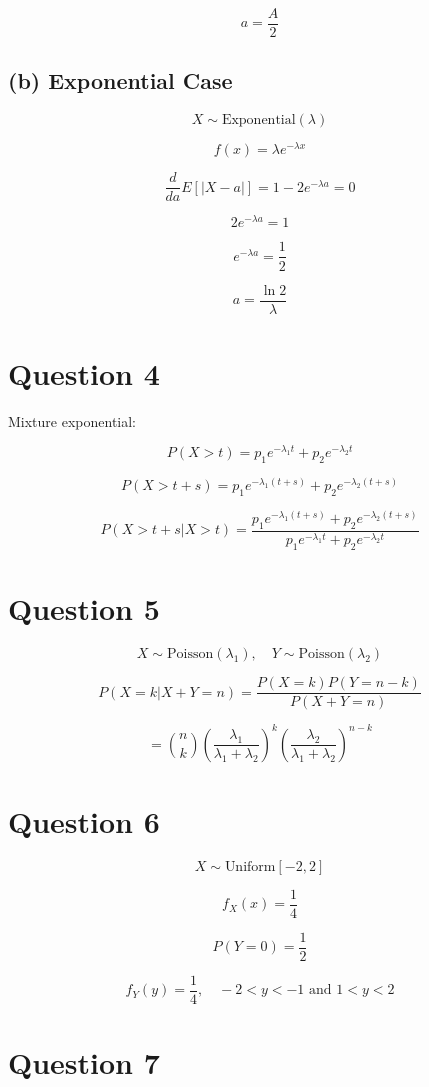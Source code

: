 \documentclass[12pt]{article}
\begin{document}
\[
a=\frac{A}{2}
\]

\subsection*{(b) Exponential Case}

\[
X \sim \text{Exponential}(\lambda)
\]

\[
f(x)=\lambda e^{-\lambda x}
\]

\[
\frac{d}{da}E[|X-a|]=1-2e^{-\lambda a}=0
\]

\[
2e^{-\lambda a}=1
\]

\[
e^{-\lambda a}=\frac{1}{2}
\]

\[
a=\frac{\ln 2}{\lambda}
\]

\section*{Question 4}

Mixture exponential:

\[
P(X>t)=p_1 e^{-\lambda_1 t}+p_2 e^{-\lambda_2 t}
\]

\[
P(X>t+s)=p_1 e^{-\lambda_1(t+s)}+p_2 e^{-\lambda_2(t+s)}
\]

\[
P(X>t+s|X>t)=\frac{p_1 e^{-\lambda_1(t+s)}+p_2 e^{-\lambda_2(t+s)}}{p_1 e^{-\lambda_1 t}+p_2 e^{-\lambda_2 t}}
\]

\section*{Question 5}

\[
X \sim \text{Poisson}(\lambda_1), \quad Y \sim \text{Poisson}(\lambda_2)
\]

\[
P(X=k|X+Y=n)=\frac{P(X=k)P(Y=n-k)}{P(X+Y=n)}
\]

\[
= \binom{n}{k}\left(\frac{\lambda_1}{\lambda_1+\lambda_2}\right)^k
\left(\frac{\lambda_2}{\lambda_1+\lambda_2}\right)^{n-k}
\]

\section*{Question 6}

\[
X \sim \text{Uniform}[-2,2]
\]

\[
f_X(x)=\frac{1}{4}
\]

\[
P(Y=0)=\frac{1}{2}
\]

\[
f_Y(y)=\frac{1}{4}, \quad -2<y<-1 \text{ and } 1<y<2
\]

\section*{Question 7}
\end{document}
